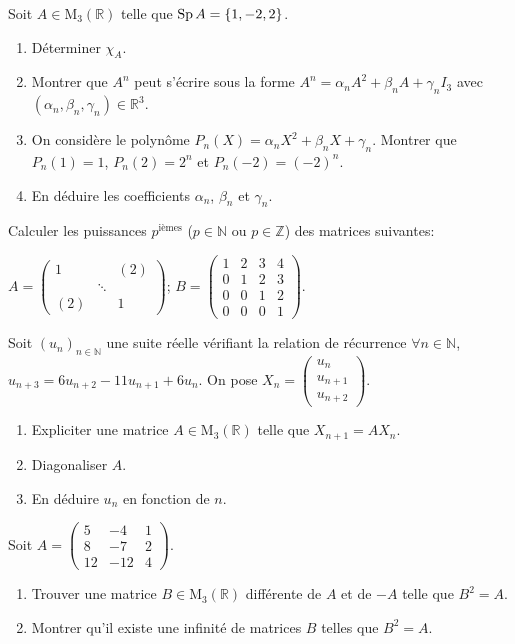 \documentclass{yann}
\begin{document}
\Exercice

Soit $A∈\mathrm{M}_3(ℝ)$ telle que $\operatorname{Sp} A = \left\{{1,-2,2}\right\}$.
\begin{enumerate}
\item Déterminer $χ_A$.
\item Montrer que $A^n$ peut s'écrire sous la forme $A^n =α_n A^2 +β_n A +γ_n I_3$ avec $(α_n,β_n,γ_n)∈ℝ^3$.
\item On considère le polynôme $P_n(X) =α_n X^2 +β_n X +γ_n$.
  Montrer que $P_n(1) = 1$, $P_n(2) = 2^n$ et $P_n(-2) = (-2)^n$.
\item En déduire les coefficients $α_n$, $β_n$ et $γ_n$.
\end{enumerate}

\Exercice

Calculer les puissances $p^{\text{ièmes}}$ ($p∈ℕ$ ou $p∈ℤ$) des matrices suivantes:

$A = \begin{pmatrix} 1 &  & (2) \\  & \ddots \\ (2) &  & 1 \end{pmatrix}$;
$B = \begin{pmatrix} 1 & 2 & 3 & 4 \\ 0 & 1 & 2 & 3 \\ 0 & 0 & 1 & 2 \\ 0 & 0 & 0 & 1 \end{pmatrix}$.

\Exercice

Soit $(u_n)_{n∈ℕ}$ une suite réelle vérifiant la relation de récurrence
$∀n∈ℕ$, $u_{n+3} = 6u_{n+2}-11u_{n+1}+6u_n$.
On pose $X_n = \begin{pmatrix} u_n \\ u_{n+1} \\ u_{n+2} \end{pmatrix}$.
\begin{enumerate}
\item Expliciter une matrice $A∈\mathrm{M}_3(ℝ)$ telle que $X_{n+1} = AX_n$.
\item Diagonaliser $A$.
\item En déduire $u_n$ en fonction de $n$.
\end{enumerate}

\Exercice

Soit $A = \begin{pmatrix} 5 & -4 & 1 \\ 8 & -7 & 2 \\ 12 & -12 & 4 \end{pmatrix}$.
\begin{enumerate}
\item Trouver une matrice $B∈\mathrm{M}_3(ℝ)$ différente de $A$ et de $-A$ telle que $B^2 = A$.
\item Montrer qu'il existe une infinité de matrices $B$ telles que $B^2 = A$.
\end{enumerate}
\end{document}
